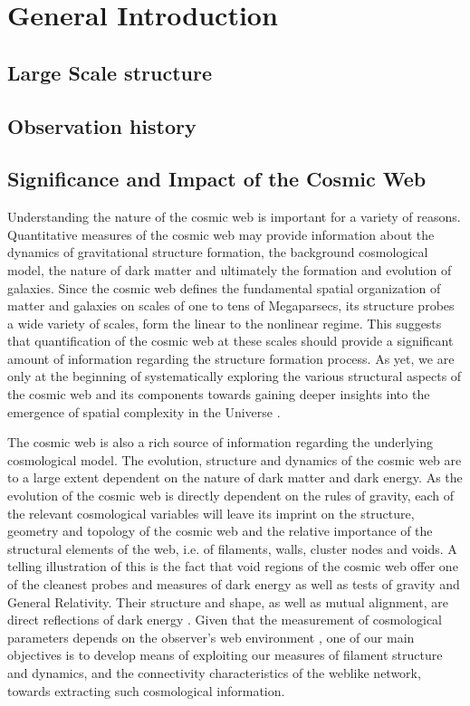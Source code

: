 
\chapter{General Introduction}


\section{Large Scale structure}

\section{Observation history}

\section{Significance and Impact of the Cosmic Web}
Understanding the nature of the cosmic web is important for a variety of reasons. Quantitative measures of the cosmic web 
may provide information about the dynamics of gravitational structure formation, the background cosmological model, the 
nature of dark matter and ultimately the formation and evolution of galaxies. Since the cosmic web defines the fundamental spatial organization of matter and galaxies on scales of one to tens of Megaparsecs, its structure probes a wide variety of scales, form the linear to the nonlinear regime. This suggests that quantification of the cosmic web at these scales should provide a significant amount of 
information regarding the structure formation process. As yet, we are only at the beginning of systematically exploring the various 
structural aspects of the cosmic web and its components towards gaining deeper insights into the emergence of spatial 
complexity in the Universe \citep[see e.g.][]{Cautun2014a}. 

The cosmic web is also a rich source of information regarding the underlying cosmological model. The evolution, structure and dynamics of the 
cosmic web are to a large extent dependent on the nature of dark matter and dark energy. As the evolution of the cosmic web 
is directly dependent on the rules of gravity, each of the relevant cosmological variables will leave its imprint on the 
structure, geometry and topology of the cosmic web and the relative importance of the structural elements of the 
web, i.e. of filaments, walls, cluster nodes and voids. A telling illustration of this is the fact that  void regions of the cosmic web offer one of the cleanest probes and measures of dark energy as well as tests of gravity and General Relativity. Their structure and shape, as well as mutual alignment, are direct 
reflections of dark energy \citep{Parklee2007,Platen2008,Leepark2009,Lavaux2010,Lavaux2012,Bos2012,Sutter2014a,Pisani2015}. Given that the measurement of cosmological parameters depends on the observer's web environment \citep[e.g.][]{Wojtak2014}, one of our 
main objectives is to develop means of exploiting our measures of filament structure and dynamics, and the connectivity 
characteristics of the weblike network, towards extracting such cosmological information. 

